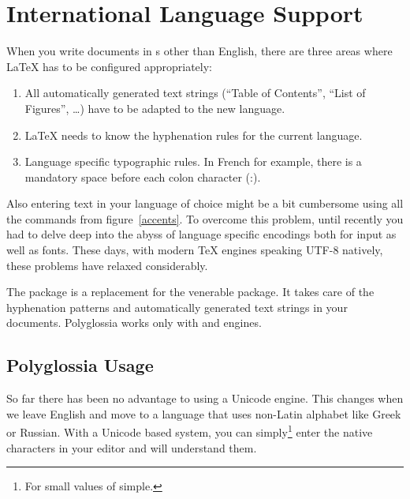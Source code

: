 \section{International Language Support}
%
 When you write documents in s
other than English, there are three areas where \LaTeX{} has to be
configured appropriately:

\begin{enumerate}
\item All automatically generated text strings (\enquote{Table of Contents},
    \enquote{List of Figures}, \ldots) have to be adapted to the new language.
\item \LaTeX{} needs to know the hyphenation rules for the current language.
\item Language specific typographic rules. In French for example, there is a
  mandatory space before each colon character (:).
\end{enumerate}

Also entering text in your language of choice might be a bit cumbersome using
all the commands from figure~\ref{accents}. To overcome this problem, until
recently you had to delve deep into the abyss of language specific encodings
both for input as well as fonts. These days, with modern \TeX{} engines
speaking UTF-8 natively, these problems have relaxed considerably.

The package  is a replacement for the venerable 
package. It takes care of the hyphenation patterns and automatically generated
text strings in your documents. Polyglossia works only with 
and  engines.

\subsection{Polyglossia Usage}

So far there has been no advantage to using a Unicode  engine. This
changes when we leave English and move to a language that uses non-Latin
alphabet like Greek or Russian. With a Unicode based system, you can
simply\footnote{For small values of simple.} enter the native characters in
your editor and  will understand them.

